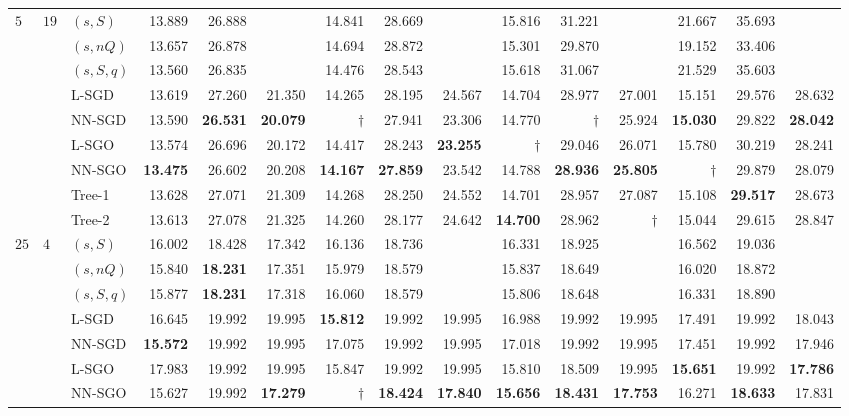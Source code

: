 \documentclass[11pt]{article}
\begin{document}
\begin{table}[!htbp]
{\begin{tabular}{lllrrrrrrrrrrrr}
\addlinespace
$5$ & $19$ & $(s,S)$ & 13.889 & 26.888 &  & 14.841 & 28.669 &  & 15.816 & 31.221 &  & 21.667 & 35.693 &  \\
 &  & $(s,nQ)$ & 13.657 & 26.878 &  & 14.694 & 28.872 &  & 15.301 & 29.870 &  & 19.152 & 33.406 &  \\
 &  & $(s,S,q)$ & 13.560 & 26.835 &  & 14.476 & 28.543 &  & 15.618 & 31.067 &  & 21.529 & 35.603 &  \\
 &  & L-SGD & 13.619 & 27.260 & 21.350 & 14.265 & 28.195 & 24.567 & 14.704 & 28.977 & 27.001 & 15.151 & 29.576 & 28.632 \\
 &  & NN-SGD & 13.590 & \textbf{26.531} & \textbf{20.079} & $\dagger$ & 27.941 & 23.306 & 14.770 & $\dagger$ & 25.924 & \textbf{15.030} & 29.822 & \textbf{28.042} \\
 &  & L-SGO & 13.574 & 26.696 & 20.172 & 14.417 & 28.243 & \textbf{23.255} & $\dagger$ & 29.046 & 26.071 & 15.780 & 30.219 & 28.241 \\
 &  & NN-SGO & \textbf{13.475} & 26.602 & 20.208 & \textbf{14.167} & \textbf{27.859} & 23.542 & 14.788 & \textbf{28.936} & \textbf{25.805} & $\dagger$ & 29.879 & 28.079 \\
 &  & Tree-1 & 13.628 & 27.071 & 21.309 & 14.268 & 28.250 & 24.552 & 14.701 & 28.957 & 27.087 & 15.108 & \textbf{29.517} & 28.673 \\
 &  & Tree-2 & 13.613 & 27.078 & 21.325 & 14.260 & 28.177 & 24.642 & \textbf{14.700} & 28.962 & $\dagger$ & 15.044 & 29.615 & 28.847 \\
\addlinespace
$25$ & $4$ & $(s,S)$ & 16.002 & 18.428 & 17.342 & 16.136 & 18.736 &  & 16.331 & 18.925 &  & 16.562 & 19.036 &  \\
 &  & $(s,nQ)$ & 15.840 & \textbf{18.231} & 17.351 & 15.979 & 18.579 &  & 15.837 & 18.649 &  & 16.020 & 18.872 &  \\
 &  & $(s,S,q)$ & 15.877 & \textbf{18.231} & 17.318 & 16.060 & 18.579 &  & 15.806 & 18.648 &  & 16.331 & 18.890 &  \\
 &  & L-SGD & 16.645 & 19.992 & 19.995 & \textbf{15.812} & 19.992 & 19.995 & 16.988 & 19.992 & 19.995 & 17.491 & 19.992 & 18.043 \\
 &  & NN-SGD & \textbf{15.572} & 19.992 & 19.995 & 17.075 & 19.992 & 19.995 & 17.018 & 19.992 & 19.995 & 17.451 & 19.992 & 17.946 \\
 &  & L-SGO & 17.983 & 19.992 & 19.995 & 15.847 & 19.992 & 19.995 & 15.810 & 18.509 & 19.995 & \textbf{15.651} & 19.992 & \textbf{17.786} \\
 &  & NN-SGO & 15.627 & 19.992 & \textbf{17.279} & $\dagger$ & \textbf{18.424} & \textbf{17.840} & \textbf{15.656} & \textbf{18.431} & \textbf{17.753} & 16.271 & \textbf{18.633} & 17.831 \\

\end{tabular}}
\end{table}
\end{document}
